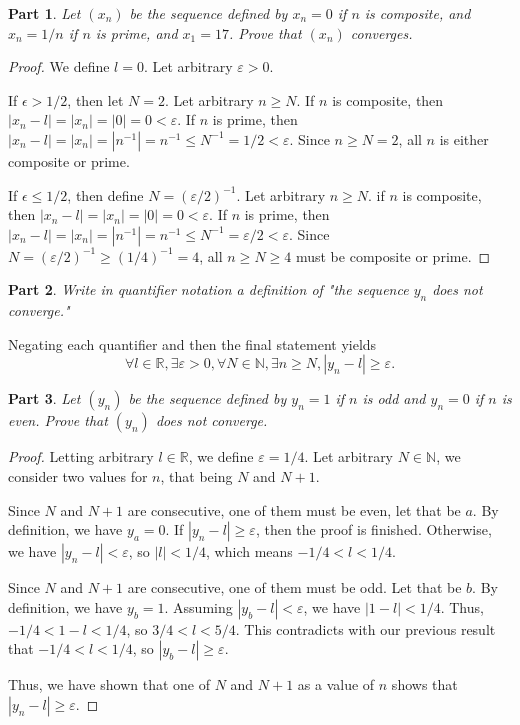 \documentclass[12pt]{article}
\theoremstyle{customstyle}
\newtheorem{subquestion}{Part}[question]
\begin{document}
\begin{subquestion}
    Let $(x_n)$ be the sequence defined by $x_n = 0$ if $n$ is composite,
    and $x_n = 1/n$ if $n$ is prime, and $x_1 = 17$.
    Prove that $(x_n)$ converges.
\end{subquestion}
\begin{proof}
    We define $l = 0$. Let arbitrary $\varepsilon > 0$.

    If $\epsilon > 1/2$, then let $N = 2$.
    Let arbitrary $n \ge N$.
    If $n$ is composite, then $|x_n - l| = |x_n| = |0| = 0 < \varepsilon$.
    If $n$ is prime, then $|x_n - l| = |x_n| = |n^{-1}| = n^{-1} \le N^{-1} = 1/2 < \varepsilon$.
    Since $n \ge N = 2$, all $n$ is either composite or prime.
    
    If $\epsilon \le 1/2$, then define $N=(\varepsilon/2)^{-1}$.
    Let arbitrary $n \ge N$.
    if $n$ is composite, then $|x_n - l| = |x_n| = |0| = 0 < \varepsilon$.
    If $n$ is prime, then $|x_n - l| = |x_n| = |n^{-1}| = n^{-1} \le N^{-1} = \varepsilon/2 < \varepsilon$.
    Since $N = (\varepsilon/2)^{-1} \ge (1/4)^{-1} = 4$, all
    $n \ge N \ge 4$ must be composite or prime.
\end{proof}

\begin{subquestion}
    Write in quantifier notation a definition of
    "the sequence $y_n$ does not converge."
\end{subquestion}

Negating each quantifier and then the final statement yields
\[
\forall l \in \mathbb{R}, \exists \varepsilon > 0, \forall N \in \mathbb{N}, \exists n \ge N, |y_n - l| \ge \varepsilon.
\]

\begin{subquestion}
    Let $(y_n)$ be the sequence defined by $y_n = 1$ if $n$ is odd and
    $y_n = 0$ if $n$ is even. Prove that $(y_n)$ does not converge.
\end{subquestion}

\begin{proof}
    Letting arbitrary $l \in \mathbb{R}$, we define $\varepsilon = 1/4$.
    Let arbitrary $N \in \mathbb{N}$, 
    we consider two values for $n$, that being $N$ and $N+1$.

    Since $N$ and $N+1$ are consecutive, one of them must be even, let that be $a$.
    By definition, we have $y_a = 0$.
    If $|y_n - l| \ge \varepsilon$, then the proof is finished.
    Otherwise, we have $|y_n - l| < \varepsilon$, so $|l| < 1/4$, 
    which means $-1/4 < l < 1/4$.

    Since $N$ and $N+1$ are consecutive, one of them must be odd. Let that be $b$.
    By definition, we have $y_b = 1$.
    Assuming $|y_b - l| < \varepsilon$, we have $|1 - l| < 1/4$.
    Thus, $-1/4 < 1 - l < 1/4$, so $3/4 < l < 5/4$.
    This contradicts with our previous result that $-1/4 < l < 1/4$,
    so $|y_b - l| \ge \varepsilon$.

    Thus, we have shown that one of $N$ and $N+1$ as a value of $n$
    shows that $|y_n -l| \ge \varepsilon$.
\end{proof}
\end{document}
